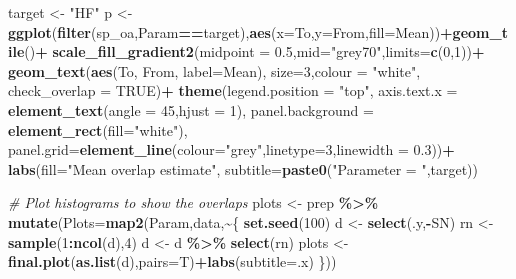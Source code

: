 \documentclass[10pt,letterpaper]{article}
\newenvironment{Shaded}{\begin{snugshade}}{\end{snugshade}}
\newcommand{\AttributeTok}[1]{\textcolor[rgb]{0.13,0.29,0.53}{#1}}
\newcommand{\CommentTok}[1]{\textcolor[rgb]{0.56,0.35,0.01}{\textit{#1}}}
\newcommand{\ConstantTok}[1]{\textcolor[rgb]{0.56,0.35,0.01}{#1}}
\newcommand{\DecValTok}[1]{\textcolor[rgb]{0.00,0.00,0.81}{#1}}
\newcommand{\FloatTok}[1]{\textcolor[rgb]{0.00,0.00,0.81}{#1}}
\newcommand{\FunctionTok}[1]{\textcolor[rgb]{0.13,0.29,0.53}{\textbf{#1}}}
\newcommand{\NormalTok}[1]{#1}
\newcommand{\OtherTok}[1]{\textcolor[rgb]{0.56,0.35,0.01}{#1}}
\newcommand{\SpecialCharTok}[1]{\textcolor[rgb]{0.81,0.36,0.00}{\textbf{#1}}}
\newcommand{\StringTok}[1]{\textcolor[rgb]{0.31,0.60,0.02}{#1}}
\begin{document}
\begin{Shaded}
\begin{Highlighting}[]
\NormalTok{target }\OtherTok{\textless{}{-}} \StringTok{"HF"}
\NormalTok{p }\OtherTok{\textless{}{-}} \FunctionTok{ggplot}\NormalTok{(}\FunctionTok{filter}\NormalTok{(sp\_oa,Param}\SpecialCharTok{==}\NormalTok{target),}\FunctionTok{aes}\NormalTok{(}\AttributeTok{x=}\NormalTok{To,}\AttributeTok{y=}\NormalTok{From,}\AttributeTok{fill=}\NormalTok{Mean))}\SpecialCharTok{+}\FunctionTok{geom\_tile}\NormalTok{()}\SpecialCharTok{+}
  \FunctionTok{scale\_fill\_gradient2}\NormalTok{(}\AttributeTok{midpoint =} \FloatTok{0.5}\NormalTok{,}\AttributeTok{mid=}\StringTok{"grey70"}\NormalTok{,}\AttributeTok{limits=}\FunctionTok{c}\NormalTok{(}\DecValTok{0}\NormalTok{,}\DecValTok{1}\NormalTok{))}\SpecialCharTok{+}
  \FunctionTok{geom\_text}\NormalTok{(}\FunctionTok{aes}\NormalTok{(To, From, }\AttributeTok{label=}\NormalTok{Mean), }\AttributeTok{size=}\DecValTok{3}\NormalTok{,}\AttributeTok{colour =} \StringTok{"white"}\NormalTok{, }\AttributeTok{check\_overlap =} \ConstantTok{TRUE}\NormalTok{)}\SpecialCharTok{+}
  \FunctionTok{theme}\NormalTok{(}\AttributeTok{legend.position =} \StringTok{"top"}\NormalTok{,}
        \AttributeTok{axis.text.x =} \FunctionTok{element\_text}\NormalTok{(}\AttributeTok{angle =} \DecValTok{45}\NormalTok{,}\AttributeTok{hjust =} \DecValTok{1}\NormalTok{),}
        \AttributeTok{panel.background =} \FunctionTok{element\_rect}\NormalTok{(}\AttributeTok{fill=}\StringTok{"white"}\NormalTok{),}
        \AttributeTok{panel.grid=}\FunctionTok{element\_line}\NormalTok{(}\AttributeTok{colour=}\StringTok{"grey"}\NormalTok{,}\AttributeTok{linetype=}\DecValTok{3}\NormalTok{,}\AttributeTok{linewidth =} \FloatTok{0.3}\NormalTok{))}\SpecialCharTok{+}
  \FunctionTok{labs}\NormalTok{(}\AttributeTok{fill=}\StringTok{"Mean overlap estimate"}\NormalTok{,}
       \AttributeTok{subtitle=}\FunctionTok{paste0}\NormalTok{(}\StringTok{"Parameter = "}\NormalTok{,target))}


\CommentTok{\# Plot histograms to show the overlaps}
\NormalTok{plots }\OtherTok{\textless{}{-}}\NormalTok{ prep }\SpecialCharTok{\%\textgreater{}\%}
          \FunctionTok{mutate}\NormalTok{(}\AttributeTok{Plots=}\FunctionTok{map2}\NormalTok{(Param,data,}\SpecialCharTok{\textasciitilde{}}\NormalTok{\{}
            \FunctionTok{set.seed}\NormalTok{(}\DecValTok{100}\NormalTok{)}
\NormalTok{            d }\OtherTok{\textless{}{-}} \FunctionTok{select}\NormalTok{(.y,}\SpecialCharTok{{-}}\NormalTok{SN)}
\NormalTok{            rn }\OtherTok{\textless{}{-}} \FunctionTok{sample}\NormalTok{(}\DecValTok{1}\SpecialCharTok{:}\FunctionTok{ncol}\NormalTok{(d),}\DecValTok{4}\NormalTok{)}
\NormalTok{            d }\OtherTok{\textless{}{-}}\NormalTok{ d }\SpecialCharTok{\%\textgreater{}\%} \FunctionTok{select}\NormalTok{(rn)}
\NormalTok{            plots }\OtherTok{\textless{}{-}} \FunctionTok{final.plot}\NormalTok{(}\FunctionTok{as.list}\NormalTok{(d),}\AttributeTok{pairs=}\NormalTok{T)}\SpecialCharTok{+}\FunctionTok{labs}\NormalTok{(}\AttributeTok{subtitle=}\NormalTok{.x)}
\NormalTok{          \}))}


\end{Highlighting}
\end{Shaded}
\end{document}
